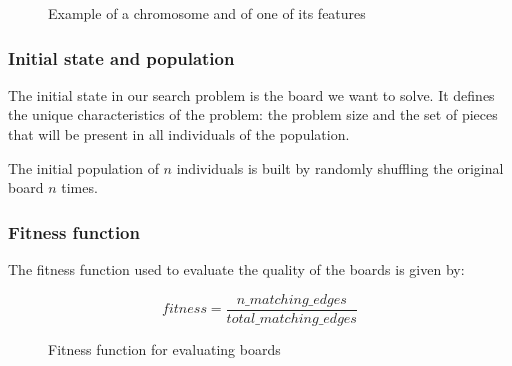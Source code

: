 \documentclass{llncs}
\begin{document}
\begin{figure}[H]
  \centering
  \hspace{5mm}
  \caption{Example of a chromosome and of one of its features}
  \label{fig:7x7_example}
\end{figure}

\subsubsection{Initial state and population}

The initial state in our search problem is the board we want to solve. It defines the unique characteristics of the problem: the problem size and the set of pieces that will be present in all individuals of the population.

The initial population of $n$ individuals is built by randomly shuffling the original board $n$ times.

\subsubsection{Fitness function}\label{sec:fitness-function}

The fitness function used to evaluate the quality of the boards is given by:

\begin{figure}[H]
  \begin{equation}
    fitness = \frac{n\_matching\_edges}{total\_matching\_edges}
  \end{equation}
  \caption{Fitness function for evaluating boards}
  \label{fig:eq:fitness_function}
\end{figure}
\end{document}
